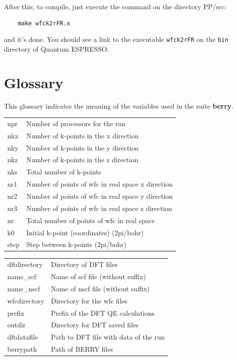 \documentclass[a4paper,12pt]{report}
\begin{document}
\begin{appendices}
After this, to compile, just execute the command on the directory PP/src:

\begin{verbatim}
    make wfck2rFR.x
\end{verbatim}
and it's done.
You should see a link to the executable \verb|wfck2rFR| on the \verb|bin| directory of {\sc Quantum ESPRESSO}.

\chapter{Glossary}

This glossary indicates the meaning of the variables used in the suite \textbf{berry}.
\vspace{0.5cm}

\begin{tabularx}{0.9\textwidth}{lX}
 npr            & Number of processors for the run \\

 nkx            & Number of k-points in the x direction \\
 nky            & Number of k-points in the y direction \\
 nkz            & Number of k-points in the z direction \\
 nks            & Total number of k-points \\

 nr1            & Number of points of wfc in real space x direction \\
 nr2            & Number of points of wfc in real space y direction \\
 nr3            & Number of points of wfc in real space z direction \\
 nr             & Total number of points of wfc in real space \\

 k0             & Initial k-point (coordinates) (2pi/bohr) \\
 step           & Step between k-points (2pi/bohr) \\
\end{tabularx}
\vspace{0.5cm}

\begin{tabularx}{0.9\textwidth}{lX}
 dftdirectory    & Directory of DFT files \\
 name\_scf       & Name of scf file (without suffix) \\
 name\_nscf      & Name of nscf file (without suffix) \\
 wfcdirectory   & Directory for the wfc files \\
 prefix         & Prefix of the DFT QE calculations \\
 outdir         & Directory for DFT saved files \\
 dftdatafile    & Path to DFT file with data of the run \\
 berrypath      & Path of BERRY files \\
\end{tabularx}
\vspace{0.5cm}


\end{appendices}
\end{document}
